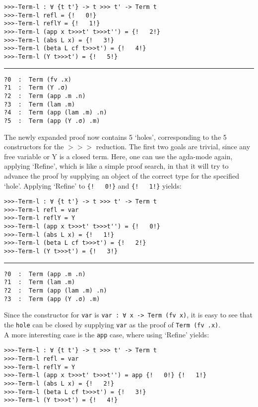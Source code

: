 \documentclass[a4paper, 12pt, twoside]{style/ociamthesis}
\theoremstyle{plain}
\theoremstyle{definition}
\newtheorem{Example}{Example}[chapter]
\theoremstyle{remark}
\newtheorem*{Remark}{Remark}
\renewenvironment{Example}{\begin{OldExample}\begin{mdframed}[style=example, linecolor=yellow]}{\end{mdframed}\end{OldExample}}
\renewenvironment{Remark}{\begin{OldRemark}\begin{mdframed}[style=example, linecolor=black]}{\end{mdframed}\end{OldRemark}}
\begin{document}
\begin{Example}
\begin{Remark}
\end{Remark}

\begin{verbatim}
>>>-Term-l : ∀ {t t'} -> t >>> t' -> Term t
>>>-Term-l refl = {!   0!}
>>>-Term-l reflY = {!   1!}
>>>-Term-l (app x t>>>t' t>>>t'') = {!   2!}
>>>-Term-l (abs L x) = {!   3!}
>>>-Term-l (beta L cf t>>>t') = {!   4!}
>>>-Term-l (Y t>>>t') = {!   5!}
\end{verbatim}

\noindent\rule{8cm}{0.4pt}

\begin{verbatim}
?0  :  Term (fv .x)
?1  :  Term (Y .σ)
?2  :  Term (app .m .n)
?3  :  Term (lam .m)
?4  :  Term (app (lam .m) .n)
?5  :  Term (app (Y .σ) .m)
\end{verbatim}

The newly expanded proof now contains 5 `holes', corresponding to the 5
constructors for the \(>>>\) reduction. The first two goals are trivial,
since any free variable or Y is a closed term. Here, one can use the
agda-mode again, applying `Refine', which is like a simple proof search,
in that it will try to advance the proof by supplying an object of the
correct type for the specified `hole'. Applying `Refine' to
\texttt{\{!\ \ \ 0!\}} and \texttt{\{!\ \ \ 1!\}} yields:

\begin{verbatim}
>>>-Term-l : ∀ {t t'} -> t >>> t' -> Term t
>>>-Term-l refl = var
>>>-Term-l reflY = Y
>>>-Term-l (app x t>>>t' t>>>t'') = {!   0!}
>>>-Term-l (abs L x) = {!   1!}
>>>-Term-l (beta L cf t>>>t') = {!   2!}
>>>-Term-l (Y t>>>t') = {!   3!}
\end{verbatim}

\noindent\rule{8cm}{0.4pt}

\begin{verbatim}
?0  :  Term (app .m .n)
?1  :  Term (lam .m)
?2  :  Term (app (lam .m) .n)
?3  :  Term (app (Y .σ) .m)
\end{verbatim}

Since the constructor for \texttt{var} is
\texttt{var : ∀ {x} -> Term (fv x)}, it is easy to see that the
\texttt{hole} can be closed by supplying \texttt{var} as the proof of
\texttt{Term (fv .x)}.\\
A more interesting case is the \texttt{app} case, where using `Refine'
yields:

\begin{verbatim}
>>>-Term-l : ∀ {t t'} -> t >>> t' -> Term t
>>>-Term-l refl = var
>>>-Term-l reflY = Y
>>>-Term-l (app x t>>>t' t>>>t'') = app {!   0!} {!   1!}
>>>-Term-l (abs L x) = {!   2!}
>>>-Term-l (beta L cf t>>>t') = {!   3!}
>>>-Term-l (Y t>>>t') = {!   4!}
\end{verbatim}


\end{Example}
\end{document}
